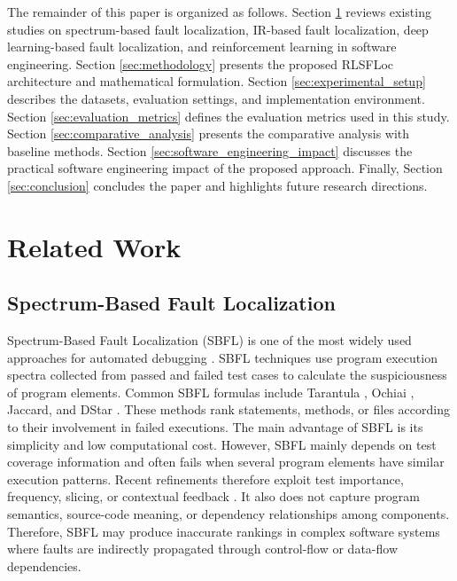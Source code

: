 \documentclass[article,article,submit,pdftex,moreauthors]{Definitions/mdpi}
\begin{document}
The remainder of this paper is organized as follows. Section \ref{sec:related_work} reviews existing studies on spectrum-based fault localization, IR-based fault localization, deep learning-based fault localization, and reinforcement learning in software engineering. Section \ref{sec:methodology} presents the proposed RLSFLoc architecture and mathematical formulation. Section \ref{sec:experimental_setup} describes the datasets, evaluation settings, and implementation environment. Section \ref{sec:evaluation_metrics} defines the evaluation metrics used in this study. Section \ref{sec:comparative_analysis} presents the comparative analysis with baseline methods. Section \ref{sec:software_engineering_impact} discusses the practical software engineering impact of the proposed approach. Finally, Section \ref{sec:conclusion} concludes the paper and highlights future research directions.

\section{Related Work}
\label{sec:related_work}

\subsection{Spectrum-Based Fault Localization}

Spectrum-Based Fault Localization (SBFL) is one of the most widely used approaches for automated debugging \cite{wong2016survey,sarhan2022survey}. SBFL techniques use program execution spectra collected from passed and failed test cases to calculate the suspiciousness of program elements. Common SBFL formulas include Tarantula \cite{jones2005tarantula}, Ochiai \cite{abreu2007ochiai}, Jaccard, and DStar \cite{wong2014dstar}. These methods rank statements, methods, or files according to their involvement in failed executions. The main advantage of SBFL is its simplicity and low computational cost. However, SBFL mainly depends on test coverage information and often fails when several program elements have similar execution patterns. Recent refinements therefore exploit test importance, frequency, slicing, or contextual feedback \cite{zhang2017pagerank,zhang2021pagerank,beszedes2022frequency,cao2022slicing,horvath2022interactive}. It also does not capture program semantics, source-code meaning, or dependency relationships among components. Therefore, SBFL may produce inaccurate rankings in complex software systems where faults are indirectly propagated through control-flow or data-flow dependencies.
\end{document}
